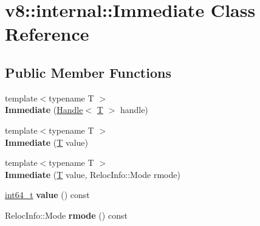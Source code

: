 \hypertarget{classv8_1_1internal_1_1Immediate}{}\section{v8\+:\+:internal\+:\+:Immediate Class Reference}
\label{classv8_1_1internal_1_1Immediate}
\subsection*{Public Member Functions}
\begin{DoxyCompactItemize}
\item 
\mbox{\label{classv8_1_1internal_1_1Immediate_a4e8bee398b88c314599c0dd63b5c063b}} 
{\footnotesize template$<$typename T $>$ }\\{\bfseries Immediate} (\mbox{\hyperlink{classv8_1_1internal_1_1Handle}{Handle}}$<$ \mbox{\hyperlink{classv8_1_1internal_1_1torque_1_1T}{T}} $>$ handle)
\item 
\mbox{\label{classv8_1_1internal_1_1Immediate_aa020cdd47a96749e2a70eb9a64440bd6}} 
{\footnotesize template$<$typename T $>$ }\\{\bfseries Immediate} (\mbox{\hyperlink{classv8_1_1internal_1_1torque_1_1T}{T}} value)
\item 
\mbox{\label{classv8_1_1internal_1_1Immediate_a1930cc50e6a8c6499c00ba08a8ccfa9b}} 
{\footnotesize template$<$typename T $>$ }\\{\bfseries Immediate} (\mbox{\hyperlink{classv8_1_1internal_1_1torque_1_1T}{T}} value, Reloc\+Info\+::\+Mode rmode)
\item 
\mbox{\label{classv8_1_1internal_1_1Immediate_a01f9651fdae1eb5b4eb4fe4c47bf24b6}} 
\mbox{\hyperlink{classint64__t}{int64\+\_\+t}} {\bfseries value} () const
\item 
\mbox{\label{classv8_1_1internal_1_1Immediate_ad5593304386226357a170928a136bdba}} 
Reloc\+Info\+::\+Mode {\bfseries rmode} () const
\item 
\mbox{\label{classv8_1_1internal_1_1Immediate_a8800793aba492f24107764f81fb93bfc}} 

\end{DoxyCompactItemize}
